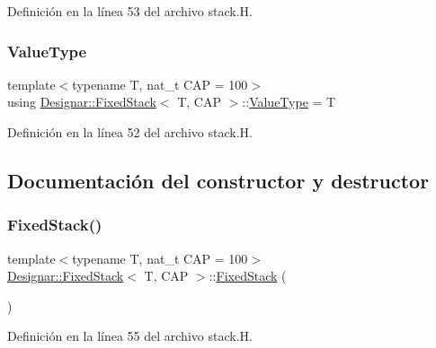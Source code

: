 Definición en la línea 53 del archivo stack.\+H.

\mbox{\label{class_designar_1_1_fixed_stack_ad69de4dde252c1a48054ce62fbf05e95}} 
\subsubsection{\texorpdfstring{Value\+Type}{ValueType}}
{\footnotesize\ttfamily template$<$typename T, nat\+\_\+t C\+AP = 100$>$ \\
using \hyperlink{class_designar_1_1_fixed_stack}{Designar\+::\+Fixed\+Stack}$<$ T, C\+AP $>$\+::\hyperlink{class_designar_1_1_fixed_stack_ad69de4dde252c1a48054ce62fbf05e95}{Value\+Type} =  T}



Definición en la línea 52 del archivo stack.\+H.



\subsection{Documentación del constructor y destructor}
\mbox{\label{class_designar_1_1_fixed_stack_a0c590a0c0a634d22c71234023f85dc2e}} 
\subsubsection{\texorpdfstring{Fixed\+Stack()}{FixedStack()}\hspace{0.1cm}{\footnotesize\ttfamily [1/3]}}
{\footnotesize\ttfamily template$<$typename T, nat\+\_\+t C\+AP = 100$>$ \\
\hyperlink{class_designar_1_1_fixed_stack}{Designar\+::\+Fixed\+Stack}$<$ T, C\+AP $>$\+::\hyperlink{class_designar_1_1_fixed_stack}{Fixed\+Stack} (\begin{DoxyParamCaption}{ }\end{DoxyParamCaption})\hspace{0.3cm}{\ttfamily [inline]}}



Definición en la línea 55 del archivo stack.\+H.

